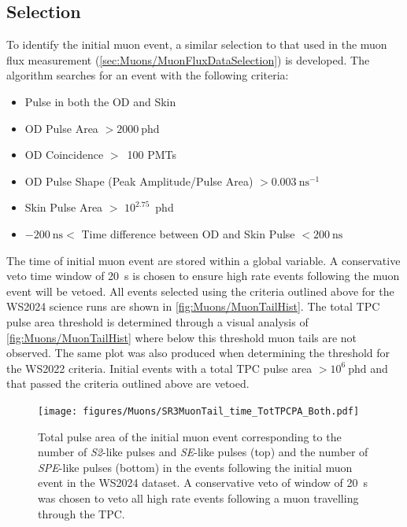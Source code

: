 \subsection{Selection}\label{sec:Muons/MuonVetoCutDesc}
To identify the initial muon event, a similar selection to that used in the muon flux measurement (\autoref{sec:Muons/MuonFluxDataSelection}) is developed. The algorithm searches for an event with the following criteria:
\begin{itemize}
    \item Pulse in both the OD and Skin
    \item OD Pulse Area $>2000~\text{phd}$
    \item OD Coincidence $>$~100 PMTs
    \item OD Pulse Shape (Peak Amplitude/Pulse Area) $>0.003~\text{ns}^{-1}$
    \item Skin Pulse Area $>$ $10^{2.75}$~phd
    \item $-200~\text{ns}<$ Time difference between OD and Skin Pulse $< 200~\text{ns}$
\end{itemize}
The time of initial muon event are stored within a global variable. A conservative veto time window of 20~s is chosen to ensure high rate events following the muon event will be vetoed. All events selected using the criteria outlined above for the WS2024 science runs are shown in \autoref{fig:Muons/MuonTailHist}. The total TPC pulse area threshold is determined through a visual analysis of \autoref{fig:Muons/MuonTailHist} where below this threshold muon tails are not observed. The same plot was also produced when determining the threshold for the WS2022 criteria. Initial events with a total TPC pulse area $>10^{6}~\text{phd}$ and that passed the criteria outlined above are vetoed.

\begin{figure}
    \centering
    \texttt{[image: figures/Muons/SR3MuonTail\_time\_TotTPCPA\_Both.pdf]}
    \caption[Total pulse area of the initial muon event corresponding to the number of \textit{S2}-like pulses and \textit{SE}-like pulses and the number of \textit{SPE}-like pulses in the events following the initial muon event.]{Total pulse area of the initial muon event corresponding to the number of \textit{S2}-like pulses and \textit{SE}-like pulses (top) and the number of \textit{SPE}-like pulses (bottom) in the events following the initial muon event in the WS2024 dataset. A conservative veto of window of 20~s was chosen to veto all high rate events following a muon travelling through the TPC.}
    \label{fig:Muons/MuonTailHist}
\end{figure}


